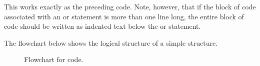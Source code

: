 \documentclass[letterpaper,10pt,english]{sphinxmanual}
\begin{document}
\begin{sphinxVerbatim}[commandchars=\\\{\}]
\end{sphinxVerbatim}

\sphinxAtStartPar
This works exactly as the preceding code.  Note, however, that if the block of code associated with an  or  statement is more than one line long, the entire block of code should be written as indented text below the  or  statement.

\sphinxAtStartPar
The flowchart below shows the logical structure of a simple  structure.

\begin{figure}[htbp]
\centering
\capstart

\noindent{}
\caption{Flowchart for  code.}\label{\detokenize{chap6/chap6_loopsconds:id3}}\label{\detokenize{chap6/chap6_loopsconds:fig-flow-if}}\end{figure}

\ignorespaces 
\end{document}
